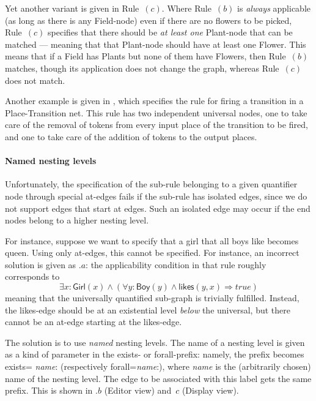 Yet another variant is given in Rule~$(c)$. Where Rule~$(b)$ is \emph{always}
applicable (as long as there is any \textsf{Field}-node) even if there are no
flowers to be picked, Rule~$(c)$ specifies that there should be \emph{at least
one} \textsf{Plant}-node that can be matched --- meaning that that
\textsf{Plant}-node should have at least one \textsf{Flower}. This means that
if a \textsf{Field} has \textsf{Plant}s but none of them have \textsf{Flower}s,
then Rule~$(b)$ matches, though its application does not change the graph,
whereas Rule~$(c)$ does not match.

Another example is given in , which specifies the rule
for firing a transition in a Place-Transition net. This rule has two
independent universal nodes, one to take care of the removal of tokens from
every input place of the transition to be fired, and one to take care of the
addition of tokens to the output places.


\paragraph{Named nesting levels}

Unfortunately, the specification of the sub-rule belonging to a given
quantifier node through special \textsf{at}-edges fails if the sub-rule has
isolated edges, since we do not support edges that start at edges. Such an
isolated edge may occur if the end nodes belong to a higher nesting level.

For instance, suppose we want to specify that a girl that all boys like becomes
queen. Using only \textsf{at}-edges, this cannot be specified. For instance, an
incorrect solution is given as .$a$: the applicability
condition in that rule roughly corresponds to
%
\[ \exists x:\textsf{Girl}(x) \wedge (\forall
y:\textsf{Boy}(y) \wedge \textsf{likes}(y,x) \Rightarrow \textit{true})
\]
%
meaning that the universally quantified sub-graph is trivially fulfilled.
Instead, the \textsf{likes}-edge should be at an existential level \emph{below}
the universal, but there cannot be an \textsf{at}-edge starting at the
\textsf{likes}-edge.

The solution is to use \emph{named} nesting levels. The name of a nesting level
is given as a kind of parameter in the \textsf{exists}- or
\textsf{forall}-prefix: namely, the prefix becomes \textsf{exists={\itshape
name}:} (respectively \textsf{forall={\itshape name}:}), where \textsf{\itshape
name} is the (arbitrarily chosen) name of the nesting level. The edge to be
associated with this label gets the same prefix. This is shown in
.$b$ (Editor view) and~$c$ (Display view).

